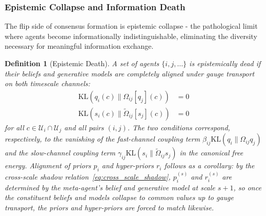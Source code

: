 \documentclass[11pt]{article}
\newtheorem{definition}{Definition}
\begin{document}
\subsubsection{Epistemic Collapse and Information Death}
\label{sec:epistemic_collapse}

The flip side of consensus formation is epistemic collapse - the pathological limit where agents become informationally indistinguishable, eliminating the diversity necessary for meaningful information exchange.

\begin{definition}[Epistemic Death]
A set of agents $\{i, j, \ldots\}$ is epistemically dead if their beliefs and generative models are completely aligned under gauge transport on both timescale channels:
\begin{align}
\mathrm{KL}(q_i(c) \| \Omega_{ij}[q_j](c)) &= 0 \\
\mathrm{KL}(s_i(c) \| \tilde{\Omega}_{ij}[s_j](c)) &= 0
\end{align}
for all $c \in \mathcal{U}_i \cap \mathcal{U}_j$ and all pairs $(i,j)$. The two conditions correspond, respectively, to the vanishing of the fast-channel coupling term $\beta_{ij}\mathrm{KL}(q_i \| \Omega_{ij}q_j)$ and the slow-channel coupling term $\gamma_{ij}\mathrm{KL}(s_i \| \tilde{\Omega}_{ij}s_j)$ in the canonical free energy. Alignment of priors $p_i$ and hyper-priors $r_i$ follows as a corollary: by the cross-scale shadow relation~\eqref{eq:cross_scale_shadow}, $p_i^{(s)}$ and $r_i^{(s)}$ are determined by the meta-agent's belief and generative model at scale $s+1$, so once the constituent beliefs and models collapse to common values up to gauge transport, the priors and hyper-priors are forced to match likewise.
\end{definition}
\end{document}
